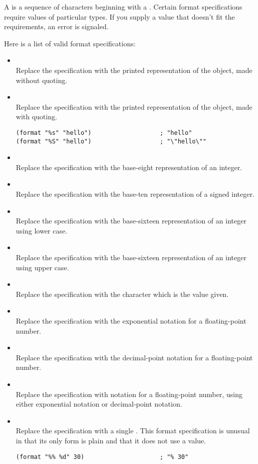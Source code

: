 A  is a sequence of characters beginning with a \argument{\%}.
Certain format specifications require values of particular types.
If you supply a value that doesn’t fit the requirements, an error is signaled.

Here is a list of valid format specifications:
\begin{itemize}[itemsep=10pt]
\item {}\\
  Replace the specification with the printed representation of the object, made without quoting.
\item {}\\
  Replace the specification with the printed representation of the object, made with quoting.
\begin{lstlisting}
(format "%s" "hello")                   ; "hello"
(format "%S" "hello")                   ; "\"hello\""
\end{lstlisting}
\item {}\\
  Replace the specification with the base-eight representation of an integer.
\item {}\\
  Replace the specification with the base-ten representation of a signed integer.
\item {}\\
  Replace the specification with the base-sixteen representation of an integer using lower case.
\item {}\\
  Replace the specification with the base-sixteen representation of an integer using upper case.
\item {}\\
  Replace the specification with the character which is the value given.
\item {}\\
  Replace the specification with the exponential notation for a floating-point number.
\item {}\\
  Replace the specification with the decimal-point notation for a floating-point number.
\item {}\\
  Replace the specification with notation for a floating-point number, using either exponential notation or decimal-point notation. 
\item \argument{\%\%}\\
  Replace the specification with a single \argument{\%}.
  This format specification is unusual in that its only form is plain \argument{\%\%} and that it does not use a value.
\begin{lstlisting}
(format "%% %d" 30)                     ; "% 30"
\end{lstlisting}

\end{itemize}



